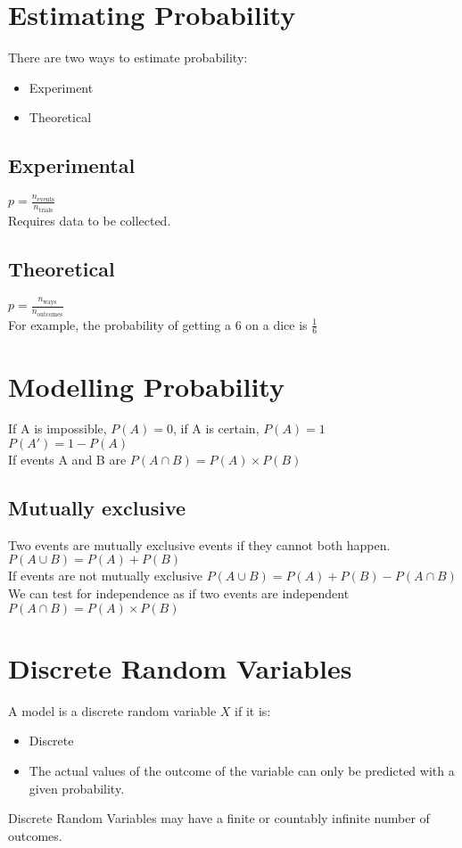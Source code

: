 \documentclass[class=article, crop=false]{standalone}
\begin{document}
\section*{Estimating Probability}
There are two ways to estimate probability:
\begin{itemize}
	\item Experiment
	\item Theoretical
\end{itemize}
\subsection*{Experimental}
$p = \frac{n_{\text{events}}}{n_{\text{trials}}}$ \\
Requires data to be collected. \\
\subsection*{Theoretical}
$p = \frac{n_{\text{ways}}}{n_{\text{outcomes}}}$ \\
For example, the probability of getting a 6 on a dice is $\frac{1}{6}$\\

\section*{Modelling Probability}
If A is impossible, $P(A) = 0$, if A is certain, $P(A) = 1$ \\
$P(A') = 1 - P(A)$ \\
If events A and B are  $P(A \cap B) = P(A) \times P(B)$ 
\subsection*{Mutually exclusive}
Two events are mutually exclusive events if they cannot both happen. \\
$P(A \cup B) = P(A) + P(B)$ \\

If events are not mutually exclusive $P(A \cup B) = P(A) + P(B) - P(A \cap B)$ \\
We can test for independence as if two events are independent $P(A \cap B) = P(A) \times P(B)$

\section*{Discrete Random Variables}
A model is a discrete random variable $X$ if it is:
\begin{itemize}
	\item Discrete
	\item The actual values of the outcome of the variable can only be predicted with a given probability.
\end{itemize}
Discrete Random Variables may have a finite or countably infinite number of outcomes.\\
\end{document}
